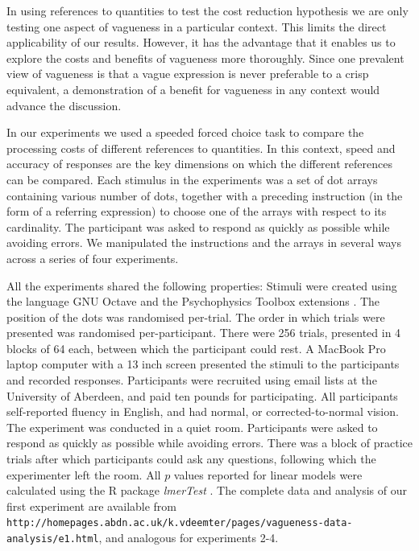 \documentclass[%
man,		%
floatsintext,%
apacite%
]{apa6}
\begin{document}
In using references to quantities to test the cost reduction hypothesis we are only testing one aspect of vagueness in a particular context. 
This limits the direct applicability of our results. 
However, it has the advantage that it enables us to explore the costs and benefits of vagueness more thoroughly. 
Since one prevalent view of vagueness is that a vague expression is never preferable to a crisp equivalent, a demonstration of a benefit for vagueness in any context would advance the discussion.

In our experiments we used a speeded forced choice task to compare the processing costs of different references to quantities. 
In this context, speed and accuracy of responses are the key dimensions on which the different references can be compared. 
Each stimulus in the experiments was a set of dot arrays containing various number of dots, together with a preceding instruction (in the form of a referring expression) to choose one of the arrays with respect to its cardinality.
The participant was asked to respond as quickly as possible while avoiding errors. 
We manipulated the instructions and the arrays in several ways across a series of four experiments. 

All the experiments shared the following properties: 
Stimuli were created using the language GNU Octave \cite{eaton:2002} and the Psychophysics Toolbox extensions \cite{ptbx1, ptbx2}.
The position of the dots was randomised per-trial.
The order in which trials were presented was randomised per-participant. 
There were 256 trials, presented in 4 blocks of 64 each, between which the participant could rest. 
A MacBook Pro laptop computer with a 13 inch screen presented the stimuli to the participants and recorded responses. 
Participants were recruited using email lists at the University of Aberdeen, and paid ten pounds for participating.
All participants self-reported fluency in English, and had normal, or corrected-to-normal vision.
The experiment was conducted in a quiet room. 
Participants were asked to respond as quickly as possible while avoiding errors.
There was a block of practice trials after which participants could ask any questions, following which the experimenter left the room.
All $p$ values reported for linear models were calculated using the R package \emph{lmerTest} \cite{lmerTest}. The complete data and analysis of our first experiment are available from 
{\tt http://homepages.abdn.ac.uk/k.vdeemter/pages/vagueness-data-analysis/e1.html}, and analogous for experiments 2-4.\\[2ex]
\end{document}
